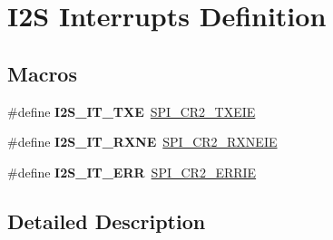 \hypertarget{group___i2_s___interrupts___definition}{}\section{I2S Interrupts Definition}
\label{group___i2_s___interrupts___definition}
\subsection*{Macros}
\begin{DoxyCompactItemize}
\item 
\mbox{\label{group___i2_s___interrupts___definition_ga84eabe0973f1fdceecbe9ff650a2bee4}} 
\#define {\bfseries I2\+S\+\_\+\+I\+T\+\_\+\+T\+XE}~\hyperlink{group___peripheral___registers___bits___definition_ga23f683a1252ccaf625cae1a978989b2c}{S\+P\+I\+\_\+\+C\+R2\+\_\+\+T\+X\+E\+IE}
\item 
\mbox{\label{group___i2_s___interrupts___definition_ga09b5f25a752905586daa4cb170043f71}} 
\#define {\bfseries I2\+S\+\_\+\+I\+T\+\_\+\+R\+X\+NE}~\hyperlink{group___peripheral___registers___bits___definition_gaa7d4c37fbbcced7f2a0421e6ffd103ea}{S\+P\+I\+\_\+\+C\+R2\+\_\+\+R\+X\+N\+E\+IE}
\item 
\mbox{\label{group___i2_s___interrupts___definition_ga7dc89e4d9188a5b7122f9f6948c28a00}} 
\#define {\bfseries I2\+S\+\_\+\+I\+T\+\_\+\+E\+RR}~\hyperlink{group___peripheral___registers___bits___definition_gaf18705567de7ab52a62e5ef3ba27418b}{S\+P\+I\+\_\+\+C\+R2\+\_\+\+E\+R\+R\+IE}
\end{DoxyCompactItemize}


\subsection{Detailed Description}
